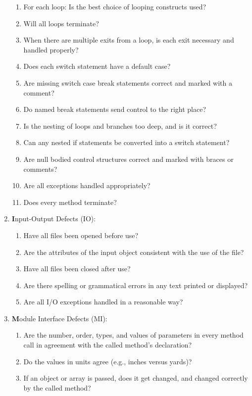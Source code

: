 \begin{enumerate}
\begin{enumerate}
\item For each loop: Is the best choice of looping constructs used?
\item Will all loops terminate?
\item When there are multiple exits from a loop, is each exit necessary and
  handled properly?
\item Does each switch statement have a default case?
\item Are missing switch case break statements correct and marked with a
  comment?
\item Do named break statements send control to the right place?
\item Is the nesting of loops and branches too deep, and is it correct?
\item Can any nested if statements be converted into a switch statement?
\item Are null bodied control structures correct and marked with braces or
  comments?
\item Are all exceptions handled appropriately?
\item Does every method terminate?
\end{enumerate}
\ifslides
\newpage
\fi
\item {\textbf Input-Output Defects (IO):}
  \begin{enumerate}
  \item Have all files been opened before use?
  \item Are the attributes of the input object consistent with the use of the
  file?
\item Have all files been closed after use?
\item Are there spelling or grammatical errors in any text printed or
  displayed?
\item Are all I/O exceptions handled in a reasonable way?
  \end{enumerate}
\item {\textbf Module Interface Defects (MI):}
\begin{enumerate}
\item Are the number, order, types, and values of parameters in every method
  call in agreement with the called method's declaration?
\item Do the values in units agree (e.g., inches versus yards)?
\item If an object or array is passed, does it get changed, and changed
  correctly by the called method?
\end{enumerate}

\end{enumerate}
